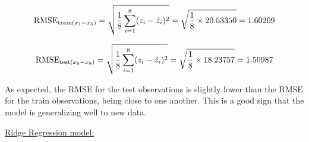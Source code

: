 \documentclass[12pt]{article}
\begin{document}
\begin{enumerate}
    \begin{equation*}
        \text{RMSE}_{\text{train}(x_1\--x_5)} = \sqrt{\frac{1}{8} \sum_{i=1}^{8} (z_{i} - \tilde{z}_{i})^2} = \sqrt{\frac{1}{8} \times 20.53350} = 1.60209
    \end{equation*}

    \begin{equation*}
        \text{RMSE}_{\text{test}(x_6\--x_8)} = \sqrt{\frac{1}{8} \sum_{i=1}^{8} (z_{i} - \tilde{z}_{i})^2} = \sqrt{\frac{1}{8} \times 18.23757} = 1.50987
    \end{equation*}
    
    \vspace{10pt}
    As expected, the RMSE for the test observations is slightly lower than the RMSE for the train observations, being close to one another. This is a good sign that the model is generalizing well to new data.
    
    \vspace{10pt}
    \underline{Ridge Regression model:}


\end{enumerate}
\end{document}
